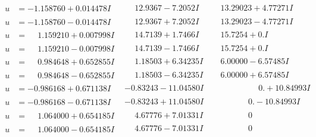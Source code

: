 \documentclass[1p]{elsarticle_modified}
\theoremstyle{definition}
\begin{document}
$$\begin{array}{c|c|c}
 \hline 
\begin{aligned}
u &= -1.158760 + 0.014478 I\end{aligned}
 & \phantom{-}12.9367 - 7.2052 I & \phantom{-}13.29023 + 4.77271 I \\ \hline\begin{aligned}
u &= -1.158760 - 0.014478 I\end{aligned}
 & \phantom{-}12.9367 + 7.2052 I & \phantom{-}13.29023 - 4.77271 I \\ \hline\begin{aligned}
u &= \phantom{-}1.159210 + 0.007998 I\end{aligned}
 & \phantom{-}14.7139 + 1.7466 I & \phantom{-}15.7254 + 0. I\phantom{ +0.000000I} \\ \hline\begin{aligned}
u &= \phantom{-}1.159210 - 0.007998 I\end{aligned}
 & \phantom{-}14.7139 - 1.7466 I & \phantom{-}15.7254 + 0. I\phantom{ +0.000000I} \\ \hline\begin{aligned}
u &= \phantom{-}0.984648 + 0.652855 I\end{aligned}
 & \phantom{-}1.18503 + 6.34235 I & \phantom{-}6.00000 - 6.57485 I \\ \hline\begin{aligned}
u &= \phantom{-}0.984648 - 0.652855 I\end{aligned}
 & \phantom{-}1.18503 - 6.34235 I & \phantom{-}6.00000 + 6.57485 I \\ \hline\begin{aligned}
u &= -0.986168 + 0.671138 I\end{aligned}
 & -0.83243 - 11.04580 I & \phantom{-0.000000 -}0. + 10.84993 I \\ \hline\begin{aligned}
u &= -0.986168 - 0.671138 I\end{aligned}
 & -0.83243 + 11.04580 I & \phantom{-0.000000 } 0. - 10.84993 I \\ \hline\begin{aligned}
u &= \phantom{-}1.064000 + 0.654185 I\end{aligned}
 & \phantom{-}4.67776 + 7.01331 I & \phantom{-0.000000 } 0 \\ \hline\begin{aligned}
u &= \phantom{-}1.064000 - 0.654185 I\end{aligned}
 & \phantom{-}4.67776 - 7.01331 I & \phantom{-0.000000 } 0 \\ \hline\begin{aligned}

\end{aligned}
\end{array}$$
\end{document}
